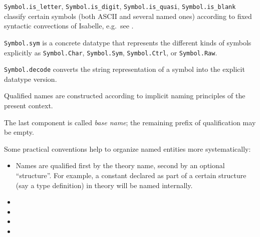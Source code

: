 \begin{isabellebody}
\begin{isamarkuptext}
\begin{description}
  \item \verb|Symbol.is_letter|, \verb|Symbol.is_digit|, \verb|Symbol.is_quasi|, \verb|Symbol.is_blank| classify certain symbols
  (both ASCII and several named ones) according to fixed syntactic
  convections of Isabelle, e.g.\ see \cite{isabelle-isar-ref}.

  \item \verb|Symbol.sym| is a concrete datatype that represents
  the different kinds of symbols explicitly as \verb|Symbol.Char|,
  \verb|Symbol.Sym|, \verb|Symbol.Ctrl|, or \verb|Symbol.Raw|.

  \item \verb|Symbol.decode| converts the string representation of a
  symbol into the explicit datatype version.

  \end{description}%
\end{isamarkuptext}%
\isamarkuptrue%
%
\endisatagmlref
{\isafoldmlref}%
%
\isadelimmlref
%
\endisadelimmlref
%
\isamarkuptrue%
%
\isadelimFIXME
%
\endisadelimFIXME
%
\isatagFIXME
%
\begin{isamarkuptext}%
Qualified names are constructed according to implicit naming
principles of the present context.


The last component is called \emph{base name}; the remaining prefix of
qualification may be empty.

Some practical conventions help to organize named entities more
systematically:

\begin{itemize}

\item Names are qualified first by the theory name, second by an
optional ``structure''.  For example, a constant  declared
as part of a certain structure  (say a type definition) in
theory  will be named  internally.

\item

\item

\item

\item

\end{itemize}


\end{isamarkuptext}
\end{isabellebody}
